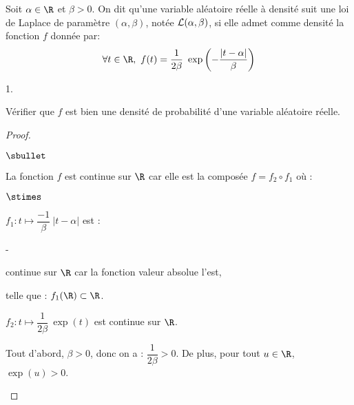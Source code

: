 \documentclass[11pt]{article}%
\begin{document}
\noindent 
Soit $\alpha\in\R$ et $\beta>0$. On dit qu'une variable aléatoire
réelle à densité suit une loi de Laplace de paramètre
$(\alpha,\beta)$, notée $\cal L(\alpha,\beta)$, si elle admet comme
densité la fonction $f$ donnée par:
\[
\forall t \in \R, \ f(t) = \dfrac{1}{2{\beta}} \ \exp\left(-
  \dfrac{|t-\alpha|}{\beta} \right)
\]
\begin{noliste}{1.}
  \setlength{\itemsep}{4mm}
\item Vérifier que $f$ est bien une densité de probabilité d'une
  variable aléatoire réelle.
  
  \begin{proof}~%
    \begin{noliste}{$\sbullet$}
    \item La fonction $f$ est continue sur $\R$ car elle est la 
    composée $f
      = f_2 \circ f_1$ où :
      \begin{noliste}{$\stimes$}
      \item $f_1 : t \mapsto \dfrac{-1}{\beta} \ |t - \alpha|$ est :
      \begin{noliste}{-}
        \item continue sur $\R$ car la fonction valeur absolue l'est,
        \item telle que : $f_1(\R) \subset \R$.
      \end{noliste}
      \item $f_2 : t \mapsto \dfrac{1}{2\beta} \ \exp(t)$ est continue 
      sur $\R$.        
      \end{noliste}

    \item Tout d'abord, $\beta > 0$, donc on a : $\dfrac{1}{2 \beta} >
      0$. De plus, pour tout $u \in \R$, $\exp(u) > 0$. %


\end{noliste}
\end{proof}
\end{noliste}
\end{document}
